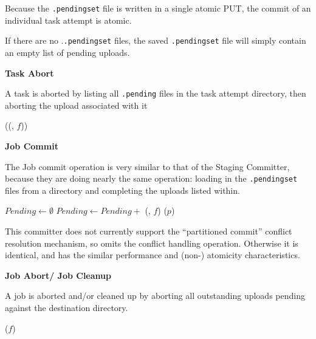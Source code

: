\documentclass[conference]{IEEEtran}
\begin{document}
Because the \texttt{.pendingset} file is written in a single atomic PUT, the
commit of an individual task attempt is atomic.

If there are no .\texttt{.pendingset} files, the saved \texttt{.pendingset} file
will simply contain an empty list of pending uploads.


\textbf{Task Abort}

A task is aborted by listing all \texttt{.pending} files in the task attempt directory,
then aborting the upload associated with it

\begin{procedure}
  \MagicVars

   {
    \abortUpload(\loadPendingFile(\fs, $f$))\;
  }

  \caption{MagicCommitter.abortTask()}
  \label{alg:MagicCommitter.abortTask}
\end{procedure}


\textbf{Job Commit}

The Job commit operation is very similar to that of the Staging Committer, because
they are doing nearly the same operation: loading in the \texttt{.pendingset} files
from a directory and completing the uploads listed within.

\begin{procedure}
  \MagicVars

  $Pending \longleftarrow \emptyset$\;
   {
    $Pending \longleftarrow Pending + $ \loadPendingSet(\fs, $f$)\;
  }
   {
    \completeUpload($p$)\;
  }

  \caption{MagicCommitter.commitJob()}
  \label{alg:MagicCommitter.commitJob}
\end{procedure}


This committer does not currently support the ``partitioned commit'' conflict
resolution mechanism, so omits the conflict handling operation.
Otherwise it is identical, and has the similar performance and (non-) atomicity
characteristics.



\textbf{Job Abort/ Job Cleanup}

A job is aborted and/or cleaned up by aborting all outstanding uploads
pending against the destination directory.

\begin{procedure}
  \MagicVars

   {
    \abortUpload($f$)\;
  }

  \caption{MagicCommitter.abortJob()}
  \label{alg:MagicCommitter.abortJob}
\end{procedure}
\end{document}
